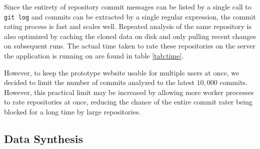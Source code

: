 Since the entirety of repository commit messages can be listed by a single call to \texttt{git log} and commits can be extracted by a single regular expression, the commit rating process is fast and scales well. Repeated analysis of the same repository is also optimized by caching the cloned data on disk and only pulling recent changes on subsequent runs. The actual time taken to rate these repositories on the server the application is running on are found in table \ref{tab:time}.

However, to keep the prototype website usable for multiple users at once, we decided to limit the number of commits analyzed to the latest $10,000$ commits. However, this practical limit may be increased by allowing more worker processes to rate repositories at once, reducing the chance of the entire commit rater being blocked for a long time by large repositories.

%
%


\subsection{Data Synthesis}

%
%
%
%
%
%

